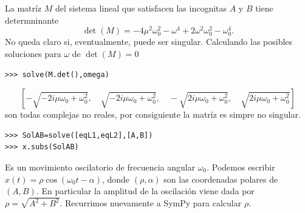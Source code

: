 La matríz $M$ del sistema lineal que satisfacen las incognitas $A$ y $B$ tiene determninante
\[\det(M)=- 4 \mu^{2} \omega_{0}^{2} - \omega^{4} + 2 \omega^{2} \omega_{0}^{2} - \omega_{0}^{4}.
\]
No queda claro si, eventualmente, puede ser singular. Calculando las posibles soluciones para $\omega$ de $\det(M)=0$
\begin{lstlisting}
>>> solve(M.det(),omega)
\end{lstlisting}
\[\left [ - \sqrt{- 2 i \mu \omega_{0} + \omega_{0}^{2}}, \quad \sqrt{- 2 i \mu \omega_{0} + \omega_{0}^{2}}, \quad - \sqrt{2 i \mu \omega_{0} + \omega_{0}^{2}}, \quad \sqrt{2 i \mu \omega_{0} + \omega_{0}^{2}}\right ]
\]
son todas complejas no reales, por consiguiente la matríz es simpre no singular.
\begin{lstlisting}
>>> SolAB=solve([eqL1,eqL2],[A,B])
>>> x.subs(SolAB)
\end{lstlisting}

Es un movimiento oscilatorio de frecuencia angular $\omega_0$. Podemos escribir $x(t)=\rho\cos(\omega_0 t-\alpha)$,
donde $(\rho,\alpha)$ son las coordenadas polares de $(A,B)$. En particular la amplitud de la oscilación viene dada por  $\rho=\sqrt{A^2+B^2}$.
Recurrimos nuevamente a SymPy para calcular $\rho$.

